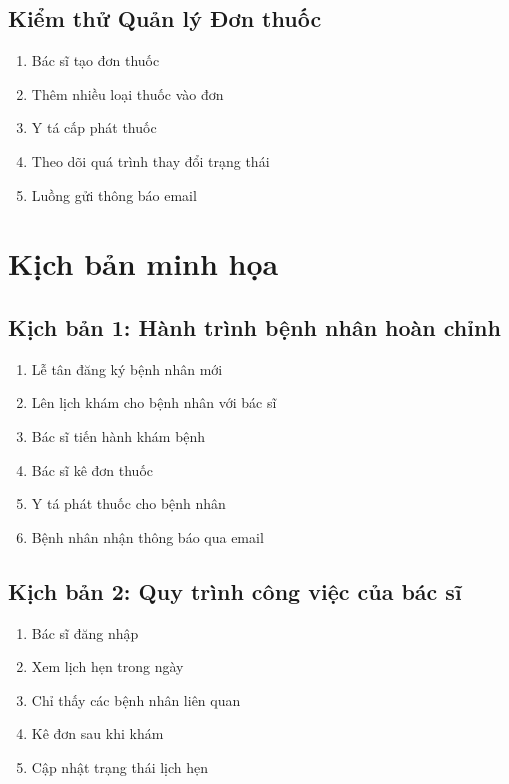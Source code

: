 \documentclass[12pt,a4paper]{report}
\begin{document}
    \subsection{Kiểm thử Quản lý Đơn thuốc}
    \begin{enumerate}
        \item Bác sĩ tạo đơn thuốc
        \item Thêm nhiều loại thuốc vào đơn
        \item Y tá cấp phát thuốc
        \item Theo dõi quá trình thay đổi trạng thái
        \item Luồng gửi thông báo email
    \end{enumerate}

    \section{Kịch bản minh họa}

    \subsection{Kịch bản 1: Hành trình bệnh nhân hoàn chỉnh}
    \begin{enumerate}
        \item Lễ tân đăng ký bệnh nhân mới
        \item Lên lịch khám cho bệnh nhân với bác sĩ
        \item Bác sĩ tiến hành khám bệnh
        \item Bác sĩ kê đơn thuốc
        \item Y tá phát thuốc cho bệnh nhân
        \item Bệnh nhân nhận thông báo qua email
    \end{enumerate}

    \subsection{Kịch bản 2: Quy trình công việc của bác sĩ}
    \begin{enumerate}
        \item Bác sĩ đăng nhập
        \item Xem lịch hẹn trong ngày
        \item Chỉ thấy các bệnh nhân liên quan
        \item Kê đơn sau khi khám
        \item Cập nhật trạng thái lịch hẹn
    \end{enumerate}
\end{document}
